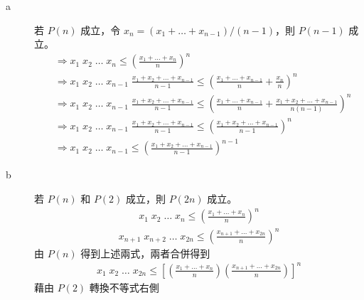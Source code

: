 \documentclass[11pt]{article}
\begin{document}
\begin{description}
	\item[a]
		若 $P(n)$ 成立，令 $x_n = (x_1 + \hdots + x_{n-1})/(n-1)$，則 $P(n-1)$ 成立。
		\begin{equation}
		\begin{split}
			& \Rightarrow x_1 \; x_2 \; \hdots \; x_n \le \left ( \frac{x_1 + \hdots + x_n}{n}\right )^n \\
			& \Rightarrow x_1 \; x_2 \; \hdots \; x_{n-1} \; \frac{x_1 + x_2 + \hdots + x_{n-1}}{n-1} \le \left ( \frac{x_1 + \hdots + x_{n-1}}{n} + \frac{x_n}{n} \right )^n \\
			& \Rightarrow x_1 \; x_2 \; \hdots \; x_{n-1} \; \frac{x_1 + x_2 + \hdots + x_{n-1}}{n-1} \le \left ( \frac{x_1 + \hdots + x_{n-1}}{n} + \frac{x_1 + x_2 + \hdots + x_{n-1}}{n(n-1)} \right )^n \\
			& \Rightarrow x_1 \; x_2 \; \hdots \; x_{n-1} \; \frac{x_1 + x_2 + \hdots + x_{n-1}}{n-1} \le \left ( \frac{x_1 + x_2 + \hdots + x_{n-1}}{n-1} \right )^n \\
			& \Rightarrow x_1 \; x_2 \; \hdots \; x_{n-1} \le \left ( \frac{x_1 + x_2 + \hdots + x_{n-1}}{n-1} \right )^{n-1}
		\end{split}
		\end{equation}
	\item[b]
		若 $P(n)$ 和 $P(2)$ 成立，則 $P(2n)$ 成立。
		\begin{equation}
		\begin{split}
			x_1 \; x_2 \; \hdots \; x_n \le \left ( \frac{x_1 + \hdots + x_n}{n}\right )^n
		\end{split}
		\end{equation}
		\begin{equation}
		\begin{split}
			x_{n+1} \; x_{n+2} \; \hdots \; x_{2n} \le \left ( \frac{x_{n+1} + \hdots + x_{2n}}{n}\right )^n
		\end{split}
		\end{equation}
		由 $P(n)$ 得到上述兩式，兩者合併得到
		\begin{equation}
		\begin{split}
			x_1 \; x_2 \; \hdots \; x_{2n} \le \left [ \left ( \frac{x_1 + \hdots + x_n}{n} \right ) \left ( \frac{x_{n+1} + \hdots + x_{2n}}{n} \right ) \right ]^n
		\end{split}
		\end{equation}
		藉由 $P(2)$ 轉換不等式右側
		\begin{equation}
		\begin{split}

\end{split}
\end{equation}
\end{description}
\end{document}
